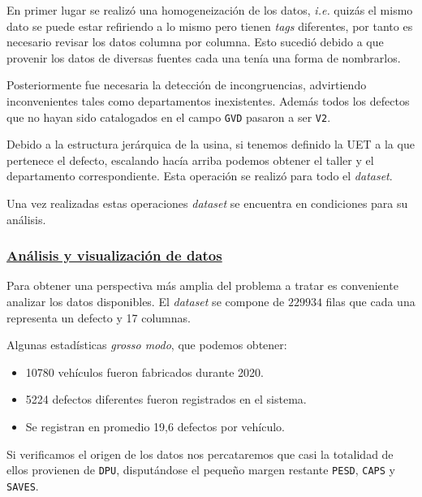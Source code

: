 \documentclass[a4paper,12pt]{article}
\begin{document}
		En primer lugar se realizó una homogeneización de los datos, \textit{i.e.} quizás el mismo dato se puede estar refiriendo a lo mismo pero tienen \textit{tags} diferentes, por tanto es necesario revisar los datos columna por columna. Esto sucedió debido a que provenir los datos de diversas fuentes cada una tenía una forma de nombrarlos. 
		
		Posteriormente fue necesaria la detección de incongruencias, advirtiendo inconvenientes tales como departamentos inexistentes. Además todos los defectos que no hayan sido catalogados en el campo \texttt{GVD} pasaron a ser \texttt{V2}.
		
		Debido a la estructura jerárquica de la usina, si tenemos definido la UET a la que pertenece el defecto, escalando hacía arriba podemos obtener el taller y el departamento correspondiente. Esta operación se realizó para todo el \textit{dataset}.
		
		Una vez realizadas estas operaciones \textit{dataset} se encuentra en condiciones para su análisis.
		
		\subsubsection{\href{https://github.com/GeraCollante/tesis-icomp-machinelearning/blob/main/DataPlottingAndAnalysis.ipynb}{\color{blue}Análisis y visualización de datos}}\label{AnalysisVisualization}
		Para obtener una perspectiva más amplia del problema a tratar es conveniente analizar los datos disponibles. El \textit{dataset} se compone de $229934$ filas que cada una representa un defecto y 17 columnas.
		
		Algunas estadísticas \textit{grosso modo}, que podemos obtener:
		
		\begin{itemize}[noitemsep, topsep=2pt]
			\item 10780 vehículos fueron fabricados durante 2020.
			\item 5224 defectos diferentes fueron registrados en el sistema.
			\item Se registran en promedio 19,6 defectos por vehículo.
		\end{itemize}
		
		Si verificamos el origen de los datos nos percataremos que casi la totalidad de ellos provienen de \texttt{DPU}, disputándose el pequeño margen restante \texttt{PESD}, \texttt{CAPS} y \texttt{SAVES}.
		
\end{document}
